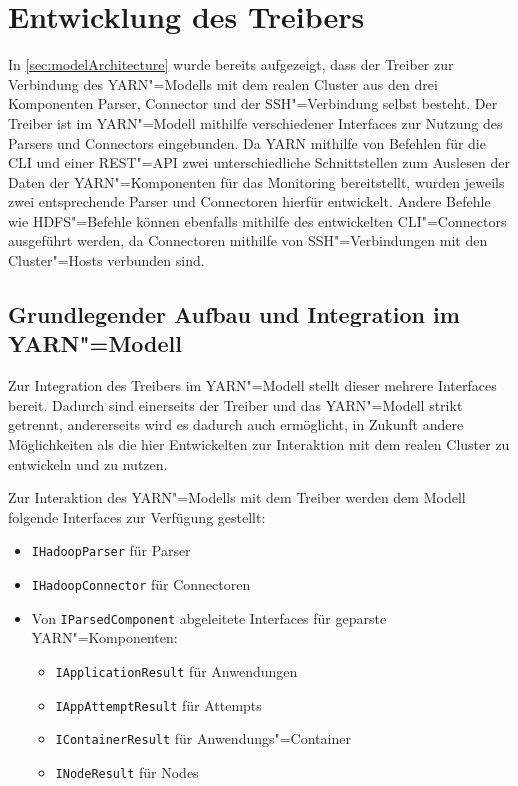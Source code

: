 \section{Entwicklung des Treibers}
\label{sec:sshDriver}

In \cref{sec:modelArchitecture} wurde bereits aufgezeigt, dass der Treiber zur Verbindung des YARN"=Modells mit dem realen Cluster aus den drei Komponenten Parser, Connector und der SSH"=Verbindung selbst besteht.
Der Treiber ist im YARN"=Modell mithilfe verschiedener Interfaces zur Nutzung des Parsers und Connectors eingebunden.
Da YARN mithilfe von Befehlen für die \gls{CLI} und einer REST"=API zwei unterschiedliche Schnittstellen zum Auslesen der Daten der YARN"=Komponenten für das Monitoring bereitstellt, wurden jeweils zwei entsprechende Parser und Connectoren hierfür entwickelt.
Andere Befehle wie \zB HDFS"=Befehle können ebenfalls mithilfe des entwickelten \gls{CLI}"=Connectors ausgeführt werden, da Connectoren mithilfe von SSH"=Verbindungen mit den Cluster"=Hosts verbunden sind.

\subsection{Grundlegender Aufbau und Integration im YARN"=Modell}
\label{subsec:driverModelIntegration}

Zur Integration des Treibers im YARN"=Modell stellt dieser mehrere Interfaces bereit.
Dadurch sind einerseits der Treiber und das YARN"=Modell strikt getrennt, andererseits wird es dadurch auch ermöglicht, in Zukunft andere Möglichkeiten als die hier Entwickelten zur Interaktion mit dem realen Cluster zu entwickeln und zu nutzen.

Zur Interaktion des YARN"=Modells mit dem Treiber werden dem Modell folgende Interfaces zur Verfügung gestellt:

\begin{itemize}
    \item \texttt{IHadoopParser} für Parser
    \item \texttt{IHadoopConnector} für Connectoren
    \item Von \texttt{IParsedComponent} abgeleitete Interfaces für geparste YARN"=Komponenten:
    \begin{itemize}
        \item \texttt{IApplicationResult} für Anwendungen
        \item \texttt{IAppAttemptResult} für Attempts
        \item \texttt{IContainerResult} für Anwendungs"=Container
        \item \texttt{INodeResult} für Nodes
    \end{itemize}
\end{itemize}

